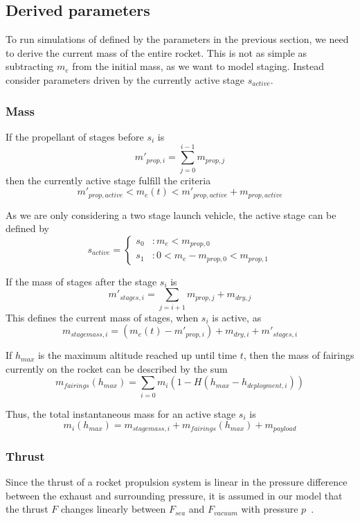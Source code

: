 \documentclass[11pt]{article}
\begin{document}
\subsection{Derived parameters}
To run simulations of defined by the parameters in the previous section, 
we need to derive the current mass of the entire rocket. This is not as simple as subtracting $m_e$ from the initial mass, as we want to model staging.
Instead consider parameters driven by the currently active stage $s_{active}$.

\subsubsection{Mass}

If the propellant of stages before $s_i$ is
$$
m'_{prop,i} = \sum_{j=0}^{i-1} m_{prop,j}
$$
then the currently active stage fulfill the criteria
$$
m'_{prop,active} < m_e(t) < m'_{prop,active} + m_{prop,active}
$$

As we are only considering a two stage launch vehicle, the active stage can be defined by
$$
s_{active} = \begin{cases} 
  s_0 & : m_e < m_{prop,0} \\
  s_1 & : 0 < m_e - m_{prop,0} < m_{prop,1}
\end{cases}
$$

If the mass of stages after the stage $s_i$ is
$$
m'_{stages,i} = \sum_{j=i+1} m_{prop,j} + m_{dry,j}
$$
This defines the current mass of stages, when $s_{i}$ is active, as
$$
m_{stagemass,i} = \left( m_e(t) - m'_{prop,i} \right) + m_{dry,i} + m'_{stages,i}
$$

If $h_{max}$ is the maximum altitude reached up until time $t$, then the mass of fairings currently on the rocket can be described by the sum
$$
m_{fairings}(h_{max}) = \sum_{i=0} m_i (1 - H(h_{max} - h_{deployment,i}))
$$

Thus, the total instantaneous mass for an active stage $s_i$ is
$$
m_i(h_{max}) = m_{stagemass,i} + m_{fairings}(h_{max}) + m_{payload}
$$

\subsubsection{Thrust}

Since the thrust of a rocket propulsion system is linear in the pressure difference between the exhaust and surrounding pressure, 
it is assumed in our model that the thrust $F$ changes linearly between $F_{sea}$ and $F_{vacuum}$ with pressure $p$~\cite{thrust}.
%
%
\end{document}
